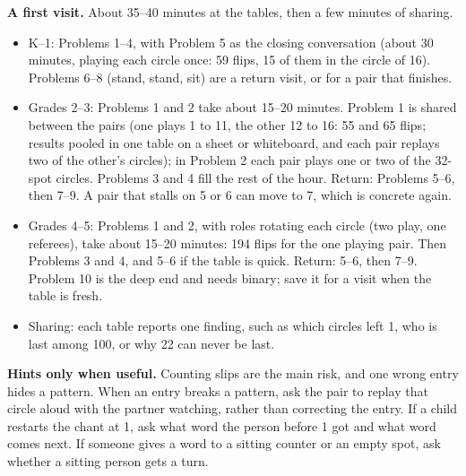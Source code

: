 \documentclass[11pt]{article}
\begin{document}
\textbf{A first visit.} About 35--40 minutes at the tables, then a few minutes of sharing.
\begin{itemize}[nosep,leftmargin=1.2em]
\item K--1: Problems 1--4, with Problem 5 as the closing conversation (about 30 minutes, playing each circle once: 59 flips, 15 of them in the circle of 16). Problems 6--8 (stand, stand, sit) are a return visit, or for a pair that finishes.
\item Grades 2--3: Problems 1 and 2 take about 15--20 minutes. Problem 1 is shared between the pairs (one plays 1 to 11, the other 12 to 16: 55 and 65 flips; results pooled in one table on a sheet or whiteboard, and each pair replays two of the other's circles); in Problem 2 each pair plays one or two of the 32-spot circles. Problems 3 and 4 fill the rest of the hour. Return: Problems 5--6, then 7--9. A pair that stalls on 5 or 6 can move to 7, which is concrete again.
\item Grades 4--5: Problems 1 and 2, with roles rotating each circle (two play, one referees), take about 15--20 minutes: 194 flips for the one playing pair. Then Problems 3 and 4, and 5--6 if the table is quick. Return: 5--6, then 7--9. Problem 10 is the deep end and needs binary; save it for a visit when the table is fresh.
\item Sharing: each table reports one finding, such as which circles left 1, who is last among 100, or why 22 can never be last.
\end{itemize}

\textbf{Hints only when useful.} Counting slips are the main risk, and one wrong entry hides a pattern. When an entry breaks a pattern, ask the pair to replay that circle aloud with the partner watching, rather than correcting the entry. If a child restarts the chant at 1, ask what word the person before 1 got and what word comes next. If someone gives a word to a sitting counter or an empty spot, ask whether a sitting person gets a turn.


\end{document}
